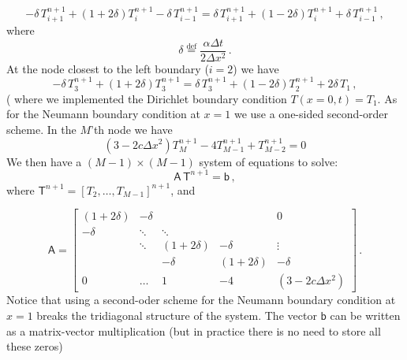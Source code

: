 \documentclass[11pt]{article}
\newcommand{\defn}{\stackrel{\text{def}}{=}}
\newcommand{\com}{\, ,}
\newcommand{\per}{\, .}
\def\beq{\begin{equation}}
\def\eeq{\end{equation}}
\begin{document}
\begin{enumerate}[label=(\alph*)]
        \beq
            \label{disc_ith}
            -\delta\,T_{i+1}^{n+1} + \left(1+2\delta\right)T_i^{n+1} -\delta\,T_{i-1}^{n+1} =   \delta\,T_{i+1}^{n+1} + \left(1-2\delta\right)T_i^{n+1} +\delta\,T_{i-1}^{n+1}\com
        \eeq
        where
        \beq
            \label{delta_defn}
            \delta \defn \frac{\alpha\Delta t}{2\Delta x^2}\per
        \eeq
        At the node closest to the left boundary ($i=2$) we have
        \beq
            \label{disc_left_boundary}
            -\delta\,T_{3}^{n+1} + \left(1+2\delta\right)T_3^{n+1} =   \delta\,T_{3}^{n+1} + \left(1-2\delta\right)T_2^{n+1} + 2\delta\,T_1\com
            \eeq  ( 
        where we implemented the Dirichlet boundary condition $T\left(x=0,t\right) = T_1$. As for the Neumann boundary condition at $x=1$ we use a one-sided second-order scheme. In the $M$'th node we have
        \beq
            \label{bc_rhs}
            (3-2 c\Delta x^2)T^{n+1}_M - 4T^{n+1}_{M-1}+T^{n+1}_{M-2} = 0
        \eeq
        We then have a $(M-1) \times (M-1)$ system of equations to solve:
    \beq
    \mathsf{A}\, \mathsf{T}^{n+1} = \mathsf{b}\com
    \eeq
    where $\mathsf{T}^{n+1} = \left[T_2,\ldots,T_{M-1}\right]^{n+1}$, and


\begin{equation} \label{matrixM}
    \mathsf{A} = \left[ \begin{matrix}
            (1+2\delta) & -\delta & && 0\\
            -\delta & \ddots & \ddots & &\\
                    & \ddots & (1+2\delta) & -\delta &\vdots\\
                    && -\delta & (1+2\delta) & -\delta \\
    0 &\ldots &1& -4 & (3-2 c\Delta x^2)\end{matrix} \right]\per
\end{equation}
Notice that using a second-oder scheme for the Neumann boundary condition at $x=1$ breaks the tridiagonal structure of the system. The vector $\mathsf{b}$ can be written as a matrix-vector multiplication (but in practice there is no need to store all these zeros)


\end{enumerate}
\end{document}
